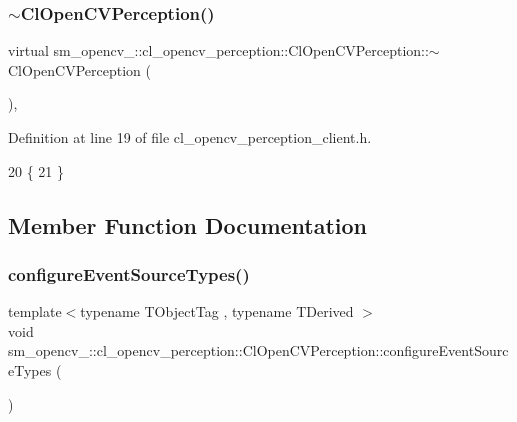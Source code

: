 \subsubsection{\texorpdfstring{$\sim$\+Cl\+Open\+C\+V\+Perception()}{~ClOpenCVPerception()}}
{\footnotesize\ttfamily virtual sm\+\_\+opencv\+\_\+::cl\+\_\+opencv\+\_\+perception\+::\+Cl\+Open\+C\+V\+Perception\+::$\sim$\+Cl\+Open\+C\+V\+Perception (\begin{DoxyParamCaption}{ }\end{DoxyParamCaption})\hspace{0.3cm}{\ttfamily [inline]}, {\ttfamily [virtual]}}



Definition at line 19 of file cl\+\_\+opencv\+\_\+perception\+\_\+client.\+h.


\begin{DoxyCode}
20   \{
21   \}
\end{DoxyCode}


\subsection{Member Function Documentation}
\mbox{\label{classsm__opencv__2_1_1cl__opencv__perception_1_1ClOpenCVPerception_a0e06cbeb7204986e2dbdc5772d749f8b}} 
\subsubsection{\texorpdfstring{configure\+Event\+Source\+Types()}{configureEventSourceTypes()}}
{\footnotesize\ttfamily template$<$typename T\+Object\+Tag , typename T\+Derived $>$ \\
void sm\+\_\+opencv\+\_\+::cl\+\_\+opencv\+\_\+perception\+::\+Cl\+Open\+C\+V\+Perception\+::configure\+Event\+Source\+Types (\begin{DoxyParamCaption}{ }\end{DoxyParamCaption})\hspace{0.3cm}{\ttfamily [inline]}}



